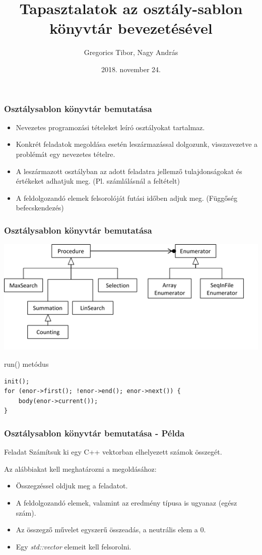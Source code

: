 \documentclass[11pt]{beamer}
\author{Gregorics Tibor, Nagy András}
\title{Tapasztalatok az osztály-sablon könyvtár bevezetésével}
\date{2018. november 24.}
\begin{document}
\begin{frame}
\titlepage
\end{frame}

\begin{frame}
	\frametitle{Osztálysablon könyvtár bemutatása}
	
	\begin{itemize}
		\item Nevezetes programozási tételeket leíró osztályokat tartalmaz.
		\item Konkrét feladatok megoldása esetén leszármazással dolgozunk, visszavezetve a problémát egy nevezetes tételre.
		\item A leszármazott osztályban az adott feladatra jellemző tulajdonságokat és értékeket adhatjuk meg. (Pl. számlálásnál a feltételt)
		\item A feldolgozandó elemek felsorolóját futási időben adjuk meg. (Függőség befecskendezés)
	\end{itemize}
\end{frame}

\begin{frame}[fragile]
	\frametitle{Osztálysablon könyvtár bemutatása}
	\includegraphics[scale=0.8]{sablon_hiearhica.png}
	
	\begin{block}{run() metódus}
		\begin{lstlisting}[basicstyle=\small]
init();
for (enor->first(); !enor->end(); enor->next()) {
    body(enor->current());
}
		\end{lstlisting}
	\end{block}
	
\end{frame}


\begin{frame}[fragile]
	\frametitle{Osztálysablon könyvtár bemutatása - Példa}	
	\begin{block}{Feladat}
		Számítsuk ki egy C++ vektorban elhelyezett számok összegét.
	\end{block}
	
	Az alábbiakat kell meghatározni a megoldásához:
	\begin{itemize}
		\item Összegzéssel oldjuk meg a feladatot.
		\item A feldolgozandó elemek, valamint az eredmény típusa is ugyanaz (egész szám).
		\item Az összegző művelet egyszerű összeadás, a neutrális elem a 0.
		\item Egy \textit{std::vector} elemeit kell felsorolni.
	\end{itemize}

	
\end{frame}
\end{document}
